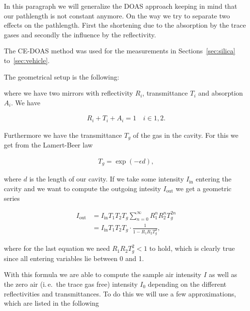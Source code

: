 In this paragraph we will generalize the DOAS approach keeping in mind
that our pathlength is not constant anymore. On the way we try to
separate two effects on the pathlength. First the shortening due to
the absorption by the trace gases and secondly the influence by the
reflectivity.

The CE-DOAS method was used for the measurements in
Sections~\ref{sec:silica} to~\ref{sec:vehicle}. 

The geometrical setup is the following:

where we have two mirrors with reflectivity $R_i$, transmittance $T_i$
and absorption $A_i$. We have

\begin{align*}
  R_i + T_i + A_i = 1 \quad i \in{1,2}.
\end{align*}

Furthermore we have the transmittance $T_g$ of the gas in the
cavity. For this we get from the Lamert-Beer law

\begin{align*}
  T_g = \exp(-\epsilon d),
\end{align*}

where $d$ is the length of our cavity. If we take some intensity
$I_{\text{in}}$ entering the cavity and we want to compute the outgoing
intesity $I_{\text{out}}$ we get a geometric series

\begin{align*}
  I_{\text{out}} & = I_{\text{in}} T_1 T_2 T_g \sum_{n=0}^\infty R_1^n R_2^n T_g^{2n}\\
  & = I_{\text{in}} T_1 T_2 T_g \cdot \frac{1}{1 - R_1R_2T_g^2},
\end{align*}

where for the last equation we need $R_1R_2T_g^2 < 1$ to hold, which
is clearly true since all entering variables lie between 0 and 1.

With this formula we are able to compute the sample air intensity $I$
as well as the zero air (i.\,e.\ the trace gas free) intensity $I_0$
depending on the different reflectivities and transmittances. To do
this we will use a few approximations, which are listed in the
following

